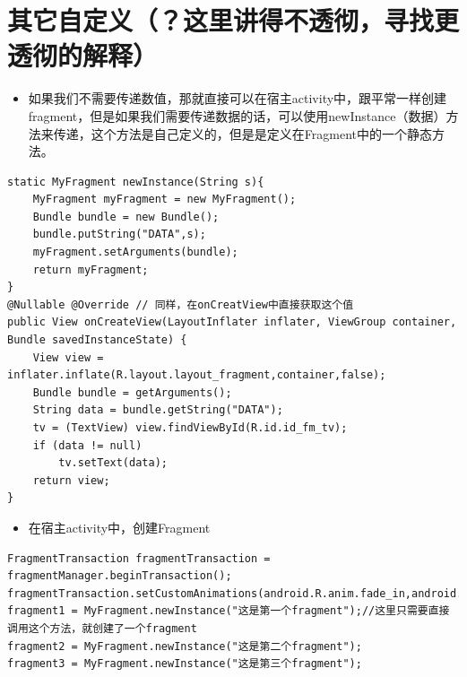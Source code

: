 \documentclass[9pt, b5paaper]{book}
\begin{document}
\section{其它自定义（？这里讲得不透彻，寻找更透彻的解释）}
\label{sec-3-4}
\begin{itemize}
\item 如果我们不需要传递数值，那就直接可以在宿主activity中，跟平常一样创建fragment，但是如果我们需要传递数据的话，可以使用newInstance（数据）方法来传递，这个方法是自己定义的，但是是定义在Fragment中的一个静态方法。
\end{itemize}
\begin{verbatim}
static MyFragment newInstance(String s){
    MyFragment myFragment = new MyFragment();
    Bundle bundle = new Bundle();
    bundle.putString("DATA",s);
    myFragment.setArguments(bundle);
    return myFragment;
}
@Nullable @Override // 同样，在onCreatView中直接获取这个值
public View onCreateView(LayoutInflater inflater, ViewGroup container, Bundle savedInstanceState) {
    View view = inflater.inflate(R.layout.layout_fragment,container,false);
    Bundle bundle = getArguments();
    String data = bundle.getString("DATA");
    tv = (TextView) view.findViewById(R.id.id_fm_tv);
    if (data != null)
        tv.setText(data);
    return view;
}
\end{verbatim}
\begin{itemize}
\item 在宿主activity中，创建Fragment
\end{itemize}
\begin{verbatim}
FragmentTransaction fragmentTransaction = fragmentManager.beginTransaction();
fragmentTransaction.setCustomAnimations(android.R.anim.fade_in,android.R.anim.fade_out);
fragment1 = MyFragment.newInstance("这是第一个fragment");//这里只需要直接调用这个方法，就创建了一个fragment
fragment2 = MyFragment.newInstance("这是第二个fragment");
fragment3 = MyFragment.newInstance("这是第三个fragment");
\end{verbatim}
\end{document}
